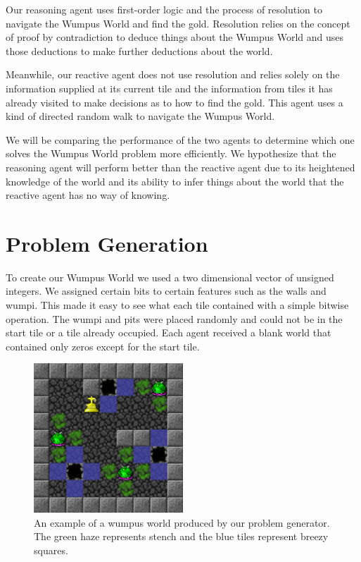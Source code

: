 \documentclass{article}
\begin{document}
		 Our reasoning agent uses first-order logic and the process of resolution to navigate the Wumpus World and find the gold. Resolution relies on the concept of proof by contradiction to deduce things about the Wumpus World and uses those deductions to make further deductions about the world.
		 
		 Meanwhile, our reactive agent does not use resolution and relies solely on the information supplied at its current tile and the information from tiles it has already visited to make decisions as to how to find the gold. This agent uses a kind of directed random walk to navigate the Wumpus World.
		 
		 We will be comparing the performance of the two agents to determine which one solves the Wumpus World problem more efficiently. We hypothesize that the reasoning agent will perform better than the reactive agent due to its heightened knowledge of the world and its ability to infer things about the world that the reactive agent has no way of knowing.
		 


\section{Problem Generation}
To create our Wumpus World we used a two dimensional vector of unsigned integers. We assigned certain bits to certain features such as the walls and wumpi. This made it easy to see what each tile contained with a simple bitwise operation. The wumpi and pits were placed randomly and could not be in the start tile or a tile already occupied. Each agent received a blank world that contained only zeros except for the start tile.
\begin{figure}[h!]
	\centering
	\includegraphics[width=0.5\textwidth]{images/ex_ww}
	\caption{An example of a wumpus world produced by our problem generator. The green haze represents stench and the blue tiles represent breezy squares.}
	\label{ex_ww}
\end{figure}
\end{document}
